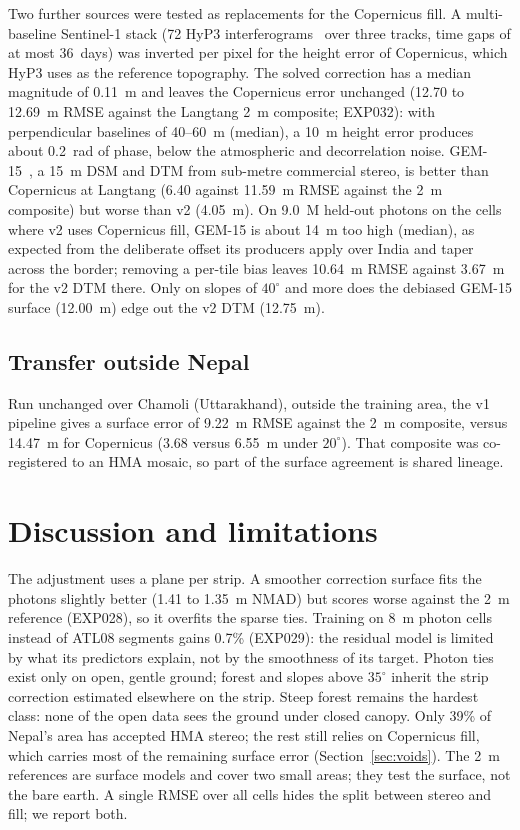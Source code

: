 \documentclass[11pt]{article}
\begin{document}
Two further sources were tested as replacements for the Copernicus fill.
A multi-baseline Sentinel-1 stack (72 HyP3 interferograms~\citep{hyp3} over three tracks, time gaps of at most
36~days) was inverted per pixel for the height error of Copernicus, which HyP3 uses as the reference topography.
The solved correction has a median magnitude of 0.11~m and leaves the Copernicus error unchanged (12.70 to
12.69~m RMSE against the Langtang 2~m composite; EXP032): with perpendicular baselines of 40--60~m (median), a 10~m height
error produces about 0.2~rad of phase, below the atmospheric and decorrelation noise.
GEM-15~\citep{gem15}, a 15~m DSM and DTM from sub-metre commercial stereo, is better than Copernicus at Langtang
(6.40 against 11.59~m RMSE against the 2~m composite) but worse than v2 (4.05~m).
On 9.0~M held-out photons on the cells where v2 uses Copernicus fill, GEM-15 is about 14~m too high (median), as
expected from the deliberate offset its producers apply over India and taper across the border; removing a per-tile
bias leaves 10.64~m RMSE against 3.67~m for the v2 DTM there.
Only on slopes of $40^\circ$ and more does the debiased GEM-15 surface (12.00~m) edge out the v2 DTM (12.75~m).

\subsection{Transfer outside Nepal}
Run unchanged over Chamoli (Uttarakhand), outside the training area, the v1 pipeline gives a surface error of
9.22~m RMSE against the 2~m composite, versus 14.47~m for Copernicus (3.68 versus 6.55~m under $20^\circ$).
That composite was co-registered to an HMA mosaic, so part of the surface agreement is shared lineage.

\section{Discussion and limitations}
The adjustment uses a plane per strip. A smoother correction surface fits the photons slightly better (1.41 to
1.35~m NMAD) but scores worse against the 2~m reference (EXP028), so it overfits the sparse ties.
Training on 8~m photon cells instead of ATL08 segments gains 0.7\% (EXP029): the residual model is limited by
what its predictors explain, not by the smoothness of its target.
Photon ties exist only on open, gentle ground; forest and slopes above $35^\circ$ inherit the strip correction
estimated elsewhere on the strip.
Steep forest remains the hardest class: none of the open data sees the ground under closed canopy.
Only 39\% of Nepal's area has accepted HMA stereo; the rest still relies on Copernicus fill, which carries most
of the remaining surface error (Section~\ref{sec:voids}).
The 2~m references are surface models and cover two small areas; they test the surface, not the bare earth.
A single RMSE over all cells hides the split between stereo and fill; we report both.
\end{document}
